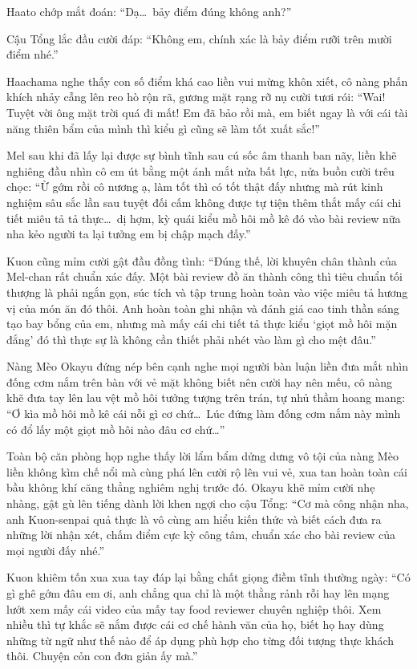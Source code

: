 \documentclass[../main.tex]{subfiles}
\begin{document}
Haato chớp mắt đoán: ``Dạ\dots\ bảy điểm đúng không anh?''

Cậu Tổng lắc đầu cười đáp: ``Không em, chính xác là bảy điểm rưỡi trên mười điểm nhé.''

Haachama nghe thấy con số điểm khá cao liền vui mừng khôn xiết, cô nàng phấn khích nhảy cẫng lên reo hò rộn rã, gương mặt rạng rỡ nụ cười tươi rói: ``Wai! Tuyệt vời ông mặt trời quá đi mất! Em đã bảo rồi mà, em biết ngay là với cái tài năng thiên bẩm của mình thì kiểu gì cũng sẽ làm tốt xuất sắc!''

Mel sau khi đã lấy lại được sự bình tĩnh sau cú sốc âm thanh ban nãy, liền khẽ nghiêng đầu nhìn cô em út bằng một ánh mắt nửa bất lực, nửa buồn cười trêu chọc: ``Ừ gớm rồi cô nương ạ, làm tốt thì có tốt thật đấy nhưng mà rút kinh nghiệm sâu sắc lần sau tuyệt đối cấm không được tự tiện thêm thắt mấy cái chi tiết miêu tả tả thực\dots\ dị hợm, kỳ quái kiểu mồ hôi mồ kê đó vào bài review nữa nha kẻo người ta lại tưởng em bị chập mạch đấy.''

Kuon cũng mỉm cười gật đầu đồng tình: ``Đúng thế, lời khuyên chân thành của Mel-chan rất chuẩn xác đấy. Một bài review đồ ăn thành công thì tiêu chuẩn tối thượng là phải ngắn gọn, súc tích và tập trung hoàn toàn vào việc miêu tả hương vị của món ăn đó thôi. Anh hoàn toàn ghi nhận và đánh giá cao tinh thần sáng tạo bay bổng của em, nhưng mà mấy cái chi tiết tả thực kiểu `giọt mồ hôi mặn đắng' đó thì thực sự là không cần thiết phải nhét vào làm gì cho mệt đâu.''

Nàng Mèo Okayu đứng nép bên cạnh nghe mọi người bàn luận liền đưa mắt nhìn đống cơm nắm trên bàn với vẻ mặt không biết nên cười hay nên mếu, cô nàng khẽ đưa tay lên lau vệt mồ hôi tưởng tượng trên trán, tự nhủ thầm hoang mang: ``Ơ kìa mồ hôi mồ kê cái nỗi gì cơ chứ\dots\ Lúc đứng làm đống cơm nắm này mình có đổ lấy một giọt mồ hôi nào đâu cơ chứ\dots''

Toàn bộ căn phòng họp nghe thấy lời lẩm bẩm dửng dưng vô tội của nàng Mèo liền không kìm chế nổi mà cùng phá lên cười rộ lên vui vẻ, xua tan hoàn toàn cái bầu không khí căng thẳng nghiêm nghị trước đó. Okayu khẽ mỉm cười nhẹ nhàng, gật gù lên tiếng dành lời khen ngợi cho cậu Tổng: ``Cơ mà công nhận nha, anh Kuon-senpai quả thực là vô cùng am hiểu kiến thức và biết cách đưa ra những lời nhận xét, chấm điểm cực kỳ công tâm, chuẩn xác cho bài review của mọi người đấy nhé.''

Kuon khiêm tốn xua xua tay đáp lại bằng chất giọng điềm tĩnh thường ngày: ``Có gì ghê gớm đâu em ơi, anh chẳng qua chỉ là một thằng rảnh rỗi hay lên mạng lướt xem mấy cái video của mấy tay food reviewer chuyên nghiệp thôi. Xem nhiều thì tự khắc sẽ nắm được cái cơ chế hành văn của họ, biết họ hay dùng những từ ngữ như thế nào để áp dụng phù hợp cho từng đối tượng thực khách thôi. Chuyện cỏn con đơn giản ấy mà.''
\end{document}
